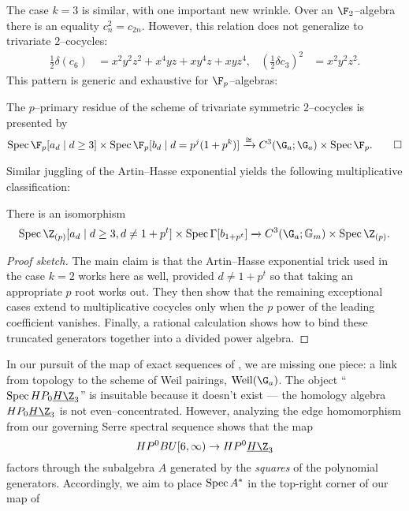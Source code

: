 The case $k = 3$ is similar, with one important new wrinkle.  Over an $\F_2$--algebra there is an equality $c_n^2 = c_{2n}$.  However, this relation does not generalize to trivariate $2$--cocycles:
\begin{align*}
\frac{1}{2} \delta (c_6) & = x^2 y^2 z^2 + x^4 y z + x y^4 z + x y z^4, &
\left(\frac{1}{2} \delta c_3\right)^2 & = x^2 y^2 z^2.
\end{align*}
This pattern is generic and exhaustive for $\F_p$--algebras:
\begin{lemma}
The $p$--primary residue of the scheme of trivariate symmetric $2$--cocycles is presented by \[\Spec \F_p[a_d \mid d \ge 3] \times \Spec \F_p[b_d \mid d = p^j(1 + p^k)] \xrightarrow{\cong} C^3(\G_a; \G_a) \times \Spec \F_p. \qed\]
\end{lemma}

\noindent Similar juggling of the Artin--Hasse exponential yields the following multiplicative classification:
\begin{theorem}
There is an isomorphism \[\Spec \Z_{(p)}[a_d \mid d \ge 3, d \ne 1 + p^t] \times \Spec \Gamma[b_{1 + p^t}] \xrightarrow{} C^3(\G_a; \Gm) \times \Spec \Z_{(p)}.\]
\end{theorem}
\begin{proof}[Proof sketch]
The main claim is that the Artin--Hasse exponential trick used in the case $k = 2$ works here as well, provided $d \ne 1 + p^t$ so that taking an appropriate $p${\th} root works out.  They then show that the remaining exceptional cases extend to multiplicative cocycles only when the $p${\th} power of the leading coefficient vanishes.  Finally, a rational calculation shows how to bind these truncated generators together into a divided power algebra.
\end{proof}

In our pursuit of the map of exact sequences of , we are missing one piece: a link from topology to the scheme of Weil pairings, $\Weil(\G_a)$.  The object ``$\Spec HP_0 \OS{H\Z}{3}$'' is insuitable because it doesn't exist --- the homology algebra $HP_0 \OS{H\Z}{3}$ is not even--concentrated.  However, analyzing the edge homomorphism from our governing Serre spectral sequence shows that the map \[HP^0 BU[6, \infty) \to HP^0 \OS{H\Z}{3}\] factors through the subalgebra $A$ generated by the \emph{squares} of the polynomial generators.  Accordingly, we aim to place $\operatorname{Spec} A^*$ in the top-right corner of our map of 

